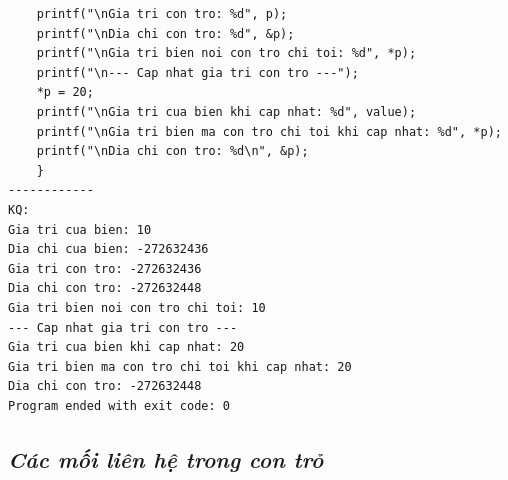 \documentclass[12pt,a4paper]{article}
\begin{document}
\begin{itemize}
\begin{lstlisting}
    printf("\nGia tri con tro: %d", p);
    printf("\nDia chi con tro: %d", &p);
    printf("\nGia tri bien noi con tro chi toi: %d", *p);
    printf("\n--- Cap nhat gia tri con tro ---");
    *p = 20;
    printf("\nGia tri cua bien khi cap nhat: %d", value);
    printf("\nGia tri bien ma con tro chi toi khi cap nhat: %d", *p);
    printf("\nDia chi con tro: %d\n", &p);
	}
------------
KQ:
Gia tri cua bien: 10
Dia chi cua bien: -272632436
Gia tri con tro: -272632436
Dia chi con tro: -272632448
Gia tri bien noi con tro chi toi: 10
--- Cap nhat gia tri con tro ---
Gia tri cua bien khi cap nhat: 20
Gia tri bien ma con tro chi toi khi cap nhat: 20
Dia chi con tro: -272632448
Program ended with exit code: 0
\end{lstlisting}
\end{itemize}

\begin{center}
	\subsection*{\textbf{\textit{Các mối liên hệ trong con trỏ}}}
\end{center}
\end{document}
